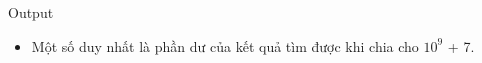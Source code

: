 Output  
\begin{itemize}
	\item     Một số duy nhất là phần dư của kết quả tìm được khi chia cho $10^{9}$    + 7.   
\end{itemize}